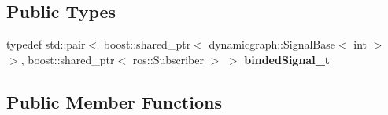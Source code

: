 \subsection*{Public Types}
\begin{DoxyCompactItemize}
\item 
\mbox{\label{classdynamic__graph_1_1RosSubscribe_a28c2e1e9ba1e6e242720086ab77e7b6f}} 
typedef std\+::pair$<$ boost\+::shared\+\_\+ptr$<$ dynamicgraph\+::\+Signal\+Base$<$ int $>$ $>$, boost\+::shared\+\_\+ptr$<$ ros\+::\+Subscriber $>$ $>$ {\bfseries binded\+Signal\+\_\+t}
\end{DoxyCompactItemize}
\subsection*{Public Member Functions}
